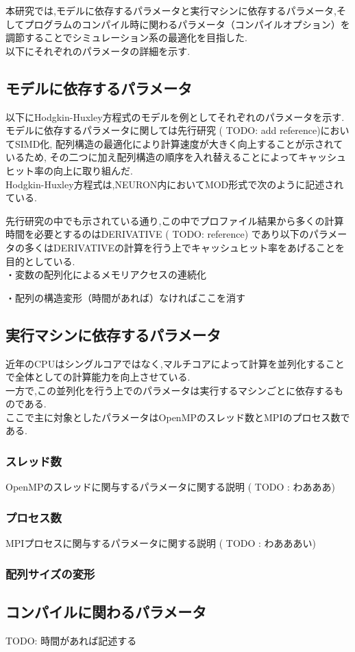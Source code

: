 本研究では,モデルに依存するパラメータと実行マシンに依存するパラメータ,そしてプログラムのコンパイル時に関わるパラメータ（コンパイルオプション）を調節することでシミュレーション系の最適化を目指した.\\
以下にそれぞれのパラメータの詳細を示す.\\
\subsection{モデルに依存するパラメータ}
以下にHodgkin-Huxley方程式のモデルを例としてそれぞれのパラメータを示す.\\
モデルに依存するパラメータに関しては先行研究 ( TODO: add reference)においてSIMD化, 配列構造の最適化により計算速度が大きく向上することが示されているため,
その二つに加え配列構造の順序を入れ替えることによってキャッシュヒット率の向上に取り組んだ.\\
Hodgkin-Huxley方程式は,NEURON内においてMOD形式で次のように記述されている.\\
{\footnotesize

}
先行研究の中でも示されている通り,この中でプロファイル結果から多くの計算時間を必要とするのはDERIVATIVE ( TODO: reference)
であり以下のパラメータの多くはDERIVATIVEの計算を行う上でキャッシュヒット率をあげることを目的としている.\\

・変数の配列化によるメモリアクセスの連続化

・配列の構造変形（時間があれば）なければここを消す
\subsection{実行マシンに依存するパラメータ}
近年のCPUはシングルコアではなく,マルチコアによって計算を並列化することで全体としての計算能力を向上させている.\\
一方で,この並列化を行う上でのパラメータは実行するマシンごとに依存するものである.\\
ここで主に対象としたパラメータはOpenMPのスレッド数とMPIのプロセス数である.\\
\subsubsection{スレッド数}
OpenMPのスレッドに関与するパラメータに関する説明 ( TODO : わあああ)
\subsubsection{プロセス数}
MPIプロセスに関与するパラメータに関する説明 ( TODO : わあああい)
\subsubsection{配列サイズの変形}

\subsection{コンパイルに関わるパラメータ}
TODO: 時間があれば記述する
